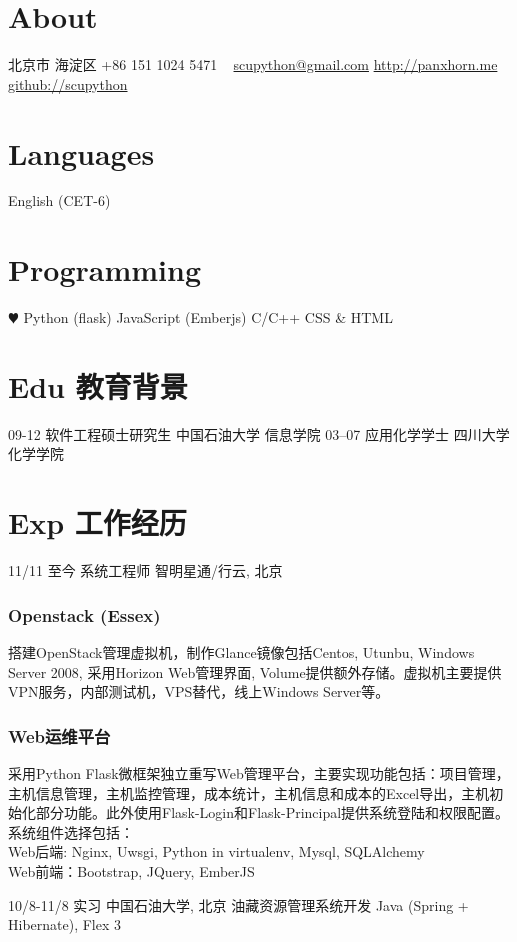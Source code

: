 \documentclass[]{friggeri-cv}
\begin{document}


\begin{aside}
  \section{About}
    北京市 海淀区
    +86 151 1024 5471
    ~
    \href{mailto:scupython@gmail.com}{scupython@gmail.com}
    \href{http://panxhorn.me}{http://panxhorn.me}
    \href{https://github.com/scupython/}{github://scupython}
  \section{Languages}
    English (CET-6)
  \section{Programming}
    {\color{red} $\varheartsuit$} Python (flask)
    JavaScript (Emberjs)
    C/C++ 
    CSS \& HTML
\end{aside}

\section{Edu 教育背景}

\begin{entrylist}
  \entry
    {09-12}
    {软件工程硕士研究生}
    {中国石油大学 信息学院}
    {}
  \entry
    {03–07}
    {应用化学学士}
    {四川大学 化学学院}
    {}
\end{entrylist}

\section{Exp 工作经历}

\begin{entrylist}
  \entry
    {11/11 至今}
    {系统工程师}
    {智明星通/行云, 北京}
    {
    \subsubsection*{Openstack (Essex)}
      \indent 搭建OpenStack管理虚拟机，制作Glance镜像包括Centos, Utunbu, Windows Server 2008, 采用Horizon Web管理界面, Volume提供额外存储。虚拟机主要提供VPN服务，内部测试机，VPS替代，线上Windows Server等。
      \subsubsection*{Web运维平台}
      \indent 采用Python Flask微框架独立重写Web管理平台，主要实现功能包括：项目管理，主机信息管理，主机监控管理，成本统计，主机信息和成本的Excel导出，主机初始化部分功能。此外使用Flask-Login和Flask-Principal提供系统登陆和权限配置。\\
      系统组件选择包括：\\
      Web后端: Nginx, Uwsgi, Python in virtualenv, Mysql, SQLAlchemy\\
      Web前端：Bootstrap, JQuery, EmberJS}
    
  \entry
    {10/8-11/8}
    {实习}
    {中国石油大学, 北京}
   { 油藏资源管理系统开发
      Java (Spring + Hibernate), Flex 3
    }
\end{entrylist}
\end{document}
